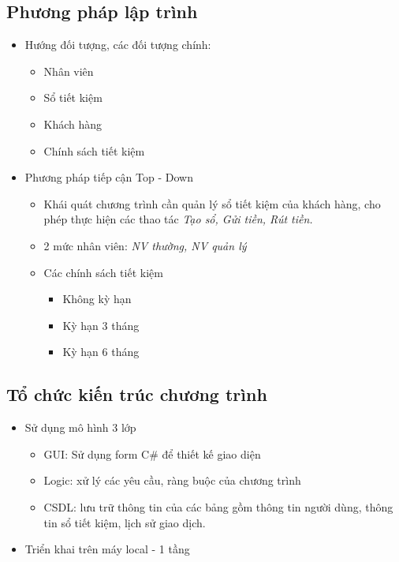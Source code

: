 \documentclass{article}
\begin{document}
			\subsection{Phương pháp lập trình}
			
				\begin{itemize}
					\item Hướng đối tượng, các đối tượng chính:
					
						\begin{itemize}
							\item Nhân viên
							\item Sổ tiết kiệm
							\item Khách hàng
							\item Chính sách tiết kiệm
						\end{itemize}
					\item Phương pháp tiếp cận Top - Down
					
						\begin{itemize}
							\item Khái quát chương trình cần quản lý sổ tiết kiệm của khách hàng, cho phép thực hiện các thao tác \textit{Tạo sổ, Gửi tiền, Rút tiền.}
							\item 2 mức nhân viên: \textit{NV thường, NV quản lý}
							\item Các chính sách tiết kiệm
							
								\begin{itemize}
									\item Không kỳ hạn
									\item Kỳ hạn 3 tháng
									\item Kỳ hạn 6 tháng
								\end{itemize}
							
						\end{itemize}
					
				\end{itemize}
			
			\subsection{Tổ chức kiến trúc chương trình}
			
				\begin{itemize}
					\item Sử dụng mô hình 3 lớp
					
						\begin{itemize}
							\item GUI: Sử dụng form C\# để thiết kế giao diện
							\item Logic: xử lý các yêu cầu, ràng buộc của chương trình
							\item CSDL: lưu trữ thông tin của các bảng gồm thông tin người dùng, thông tin sổ tiết kiệm, lịch sử giao dịch.
						\end{itemize}
					
					\item Triển khai trên máy local - 1 tầng
				\end{itemize}
			
\end{document}
